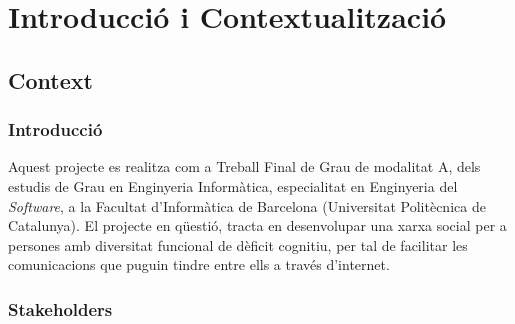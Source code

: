 \documentclass[11pt,catalan,listoffigures,listoftables]{tfgetsinf}
\begin{document}

\mainmatter


\chapter{Introducció i Contextualització}

\section{Context}

\subsection{Introducció}

Aquest projecte es realitza com a Treball Final de Grau de modalitat A, dels estudis de Grau en Enginyeria Informàtica, especialitat en Enginyeria del \textit{Software}, a la Facultat d’Informàtica de Barcelona (Universitat Politècnica de Catalunya).
El projecte en qüestió, tracta en desenvolupar una xarxa social per a persones amb diversitat funcional de dèficit cognitiu, per tal de facilitar les comunicacions que puguin tindre entre ells a través d’internet.

\subsection{Stakeholders}
\end{document}
